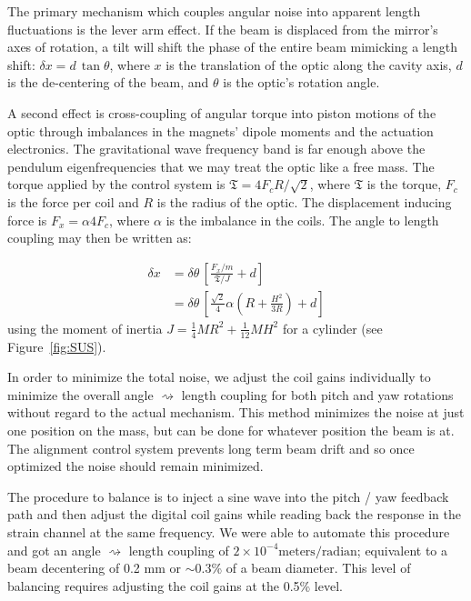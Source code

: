 The primary mechanism which couples angular noise into apparent length fluctuations
is the lever arm effect. If the beam is displaced from
the mirror's axes of rotation, a tilt will shift the phase of the entire beam
mimicking a length shift: $\delta x = d \, \tan{\theta}$, where $x$ is the translation
of the optic along the cavity axis, $d$ is the de-centering of the beam, and $\theta$
is the optic's rotation angle.

A second effect is cross-coupling of angular torque into piston motions of the optic
through imbalances in the magnets' dipole moments and the actuation electronics. 
The gravitational wave frequency band is far enough above the pendulum eigenfrequencies that 
we may treat the optic like a free mass. The torque applied by the control system is
$\mathfrak{T} = 4 F_c R/\sqrt{2}$, where $\mathfrak{T}$ is the torque, 
$F_c$ is the force per coil 
and $R$ is the radius of the optic. The displacement inducing force is 
$F_x = \alpha 4 F_c$, where $\alpha$ is the imbalance in the coils. The angle 
to length coupling may then be written as:

\begin{equation}
 \begin{aligned}
  \delta x &= \delta \theta \, \left [ \frac{F_x / m}{\mathfrak{T} / J} + d \right ]      \\
           &= \delta \theta \, \left [ \frac{\sqrt{2}}{4} \alpha 
               \left( R + \frac{H^2}{3 R} \right) + d \right ]
 \end{aligned}
\end{equation}
using the moment of inertia $J = \frac{1}{4} M R^2 + \frac{1}{12} M H^2$ for
a cylinder (see Figure~\ref{fig:SUS}).

In order to minimize the total noise, we adjust the coil gains individually to
minimize the overall angle $\rightsquigarrow$ length coupling for both pitch
and yaw rotations without regard to the actual mechanism. This method minimizes 
the noise at just one position on the mass, but can be done for whatever
position the beam is at. The alignment control system prevents long term
beam drift and so once optimized the noise should remain minimized.

The procedure to balance is to inject a sine wave into the 
pitch / yaw feedback path and then adjust the digital coil gains while reading 
back the response in the strain channel at the same frequency. We were able to 
automate this procedure and 
got an angle $\rightsquigarrow$ length coupling of 
$2 \times 10^{-4} \mbox{meters}/\mbox{radian}$; 
equivalent to a beam decentering of 0.2 mm or $\sim$0.3\% of a beam diameter. 
This level of balancing requires adjusting the coil gains at the 0.5\% level.

